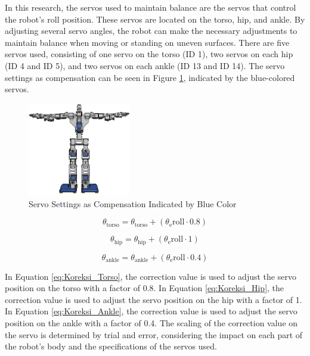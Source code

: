 \begin{enumerate}[label=\Alph*.]
    \hspace*{1em} In this research, the servos used to maintain balance are the servos that control the robot's roll position. These servos are located on the torso, hip, and ankle. By adjusting several servo angles, the robot can make the necessary adjustments to maintain balance when moving or standing on uneven surfaces. There are five servos used, consisting of one servo on the torso (ID 1), two servos on each hip (ID 4 and ID 5), and two servos on each ankle (ID 13 and ID 14). The servo settings as compensation can be seen in Figure \ref{fig:Controlled_Servo}, indicated by the blue-colored servos.

    \begin{figure} [h] \centering
      \includegraphics[width=0.4\textwidth]{gambar/controlled_servo.png}
      \caption{Servo Settings as Compensation Indicated by Blue Color}
      \label{fig:Controlled_Servo}
    \end{figure}

    \begin{equation}
      \theta_{\mathrm{torso}} = \theta_{\mathrm{torso}} + (\theta_\mathrm{e}{\mathrm{roll}} \cdot 0.8)
      \label{eq:Koreksi_Torso}
    \end{equation}

    \begin{equation}
      \theta_{\mathrm{hip}} = \theta_{\mathrm{hip}} + (\theta_\mathrm{e}{\mathrm{roll}} \cdot 1)
      \label{eq:Koreksi_Hip}
    \end{equation}

    \begin{equation}
      \theta_{\mathrm{ankle}} = \theta_{\mathrm{ankle}} + (\theta_\mathrm{e}{\mathrm{roll}} \cdot 0.4)
      \label{eq:Koreksi_Ankle}
    \end{equation}

    \hspace*{1em} In Equation \ref{eq:Koreksi_Torso}, the correction value is used to adjust the servo position on the torso with a factor of 0.8. In Equation \ref{eq:Koreksi_Hip}, the correction value is used to adjust the servo position on the hip with a factor of 1. In Equation \ref{eq:Koreksi_Ankle}, the correction value is used to adjust the servo position on the ankle with a factor of 0.4. The scaling of the correction value on the servo is determined by trial and error, considering the impact on each part of the robot's body and the specifications of the servos used.

\hspace*{1em} 
\end{enumerate}